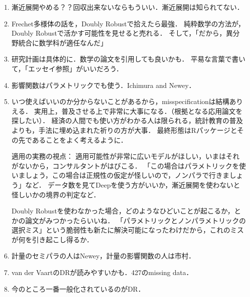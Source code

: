 \documentclass[uplatex, dvipdfmx]{jsarticle}
\begin{document}
\begin{enumerate}
    \item 漸近展開やめる？？回収出来ないならもういい．漸近展開は知られてない．
    \item Frechet多様体の話を，Doubly Robustで拾えたら最強．
    純粋数学の方法が，Doubly Robustで活かす可能性を見せると売れる．
    そして，「だから，異分野統合に数学科が適任なんだ」
    \item 研究計画は具体的に．数学の論文を引用しても良いかも．
    平易な言葉で書いて，「エッセイ参照」がいいだろう．
    \item 影響関数はパラメトリックでも使う．Ichimura and Newey．
    \item いつ使えばいいのか分からないことがあるから，misspecificationは結構ありえる．
    実用上，普及させる上で非常に大事になる．（根拠となる応用論文を探したい）．
    経済の人間でも使い方がわかる人は限られる，統計教育の普及よりも，手法に埋め込まれた祈りの方が大事．
    最終形態はRパッケージとその先であることをよく考えるように．

    適用の実務の視点：
    適用可能性が非常に広いモデルがほしい，いまはそれがないから，コンサルタントがはびこる．
    「この場合はパラメトリックを使いましょう，この場合は正規性の仮定が怪しいので，ノンパラで行きましょう」など．
    データ数を見てDeepを使う方がいいか，漸近展開を使わないと怪しいかの境界の判定など．

    Doubly Robustを使わなかった場合，どのようなひどいことが起こるか，とかの論文がみつかったらいいね．
    「パラメトリックとノンパラメトリックの選択ミス」という脆弱性も新たに解決可能になったわけだから，これのミスが何を引き起こし得るか．
    \item 計量のセミパラの人はNewey，計量の影響関数の人は市村．
    \item van der VaartのDRが読みやすいかも．427のmissing data．
    \item 今のところ一番一般化されているのがDR．
\end{enumerate}
\end{document}
